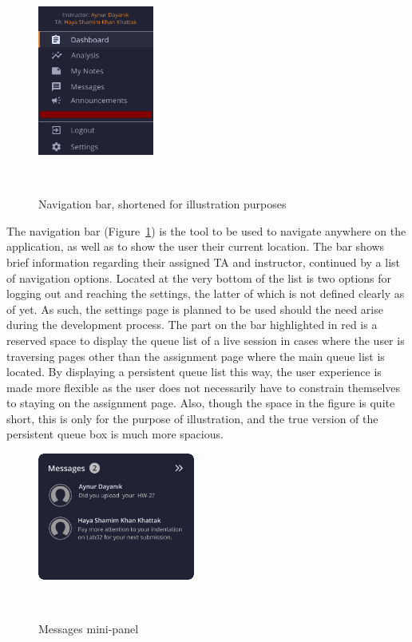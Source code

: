 \documentclass[a4paper, 12pt]{article}
\begin{document}
    \begin{figure}
        \centering
        \vspace{-15pt}
        \includegraphics[width=0.34\textwidth]{navbar_short}
        \caption{Navigation bar, shortened for illustration purposes}~\label{fig:navbar_short}
    \end{figure}

    The navigation bar (Figure~\ref{fig:navbar_short}) is the tool to be used to navigate
    anywhere on the application, as well as to show the user their current location. The bar shows brief information regarding
    their assigned TA and instructor, continued by a list of navigation options. Located at the very bottom of the list is two
    options for logging out and reaching the settings, the latter of which is not defined clearly as of yet. As such, the settings
    page is planned to be used should the need arise during the development process. The part on the bar highlighted in red is
    a reserved space to display the queue list of a live session in cases where the user is traversing pages other than the assignment page
    where the main queue list is located. By displaying a persistent queue list this way, the user experience is made more flexible as
    the user does not necessarily have to constrain themselves to staying on the assignment page. Also, though the space in the figure
    is quite short, this is only for the purpose of illustration, and the true version of the persistent queue box is much more spacious.

    \begin{figure}
        \centering
        \vspace{-15pt}
        \includegraphics[width=0.46\textwidth]{messages_panel}
        \caption{Messages mini-panel}~\label{fig:messages_panel}
    \end{figure}
\end{document}
